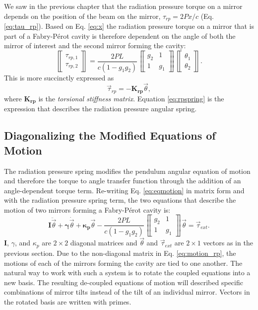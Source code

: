 We saw in the previous chapter that the radiation pressure torque on a
mirror depends on the position of the beam on the mirror, $\tau_{rp} =
2 P x / c$ (Eq. \ref{eq:tau_rp}). Based on Eq. \ref{eq:x} the
radiation pressure torque on a mirror that is part of a
Fabry-P\'{e}rot cavity is therefore dependent on the angle of both the
mirror of interest and the second mirror forming the cavity:
\begin{equation}
\left\llbracket \begin{array}{c}
\tau_{rp,1}\\
\tau_{rp,2} \end{array} \right\rrbracket = \frac{2 P L}{c (1-g_1 g_2)}
\left\llbracket \begin{array}{cc}
g_2 & 1\\
1 & g_1\end{array} \right\rrbracket
\left\llbracket \begin{array}{c}
\theta_1\\
\theta_2 \end{array} \right\rrbracket.
\end{equation}
This is more succinctly expressed as
\begin{equation}
\vec{\tau}_{rp} = -\mathbf{K_{rp}} \vec{\theta},
\label{eq:rpspring}
\end{equation}
where $\mathbf{K_{rp}}$ is the \emph{torsional stiffness
  matrix}. Equation \ref{eq:rpspring} is the expression that describes
the radiation pressure angular spring.




\subsection{Diagonalizing the Modified Equations of Motion}
\label{sec:eigenbasis}
The radiation pressure spring modifies the pendulum angular equation
of motion and therefore the torque to angle transfer function
through the addition of an angle-dependent torque term. Re-writing
Eq. \ref{eq:eqmotion} in matrix form and with the radiation pressure
spring term, the two equations that describe the motion of two mirrors
forming a Fabry-P\'{e}rot cavity is: 
\begin{equation}
\mathbf{I} \ddot{\vec{\theta}} 
+ {\bm \gamma} \dot{\vec{\theta}} 
+ \mathbf{\kappa_p} \vec{\theta}
- \frac{2 P L}{c (1-g_1 g_2)}
\left\llbracket \begin{array}{cc}
g_2 & 1\\
1 & g_1\end{array} \right\rrbracket \vec{\theta} 
= \vec{\tau}_{ext}.
\label{eq:motion_rp}
\end{equation}
$\mathbf{I}$, $\gamma$, and $\kappa_p$ are $2 \times 2$ diagonal
matrices and $\vec{\theta}$ and $\vec{\tau}_{ext}$ are $2 \times 1$
vectors as in the previous section. Due to the non-diagonal matrix in
Eq. \ref{eq:motion_rp}, the motions of each of the mirrors forming the
cavity are tied to one another. The natural way to work with such a
system is to rotate the coupled equations into a new basis. The
resulting de-coupled equations of motion will described specific
combinations of mirror tilts instead of the tilt of an individual mirror. Vectors in
the rotated basis are written with primes.

